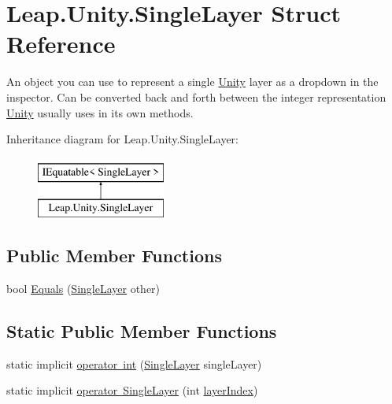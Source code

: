 \hypertarget{struct_leap_1_1_unity_1_1_single_layer}{}\section{Leap.\+Unity.\+Single\+Layer Struct Reference}
\label{struct_leap_1_1_unity_1_1_single_layer}


An object you can use to represent a single \mbox{\hyperlink{namespace_leap_1_1_unity}{Unity}} layer as a dropdown in the inspector. Can be converted back and forth between the integer representation \mbox{\hyperlink{namespace_leap_1_1_unity}{Unity}} usually uses in its own methods.  


Inheritance diagram for Leap.\+Unity.\+Single\+Layer\+:\begin{figure}[H]
\begin{center}
\leavevmode
\includegraphics[height=2.000000cm]{struct_leap_1_1_unity_1_1_single_layer}
\end{center}
\end{figure}
\subsection*{Public Member Functions}
\begin{DoxyCompactItemize}
\item 
bool \mbox{\hyperlink{struct_leap_1_1_unity_1_1_single_layer_ae66a15ea93a27bce3c4ed9d776e23b86}{Equals}} (\mbox{\hyperlink{struct_leap_1_1_unity_1_1_single_layer}{Single\+Layer}} other)
\end{DoxyCompactItemize}
\subsection*{Static Public Member Functions}
\begin{DoxyCompactItemize}
\item 
static implicit \mbox{\hyperlink{struct_leap_1_1_unity_1_1_single_layer_a1e00fd683fac42db7b88412ebf02d62a}{operator int}} (\mbox{\hyperlink{struct_leap_1_1_unity_1_1_single_layer}{Single\+Layer}} single\+Layer)
\item 
static implicit \mbox{\hyperlink{struct_leap_1_1_unity_1_1_single_layer_aaddddeb522c951355a05c1aff7cc45ca}{operator Single\+Layer}} (int \mbox{\hyperlink{struct_leap_1_1_unity_1_1_single_layer_a5e955c6fd2ba1991b97b333e176f005b}{layer\+Index}})
\end{DoxyCompactItemize}
